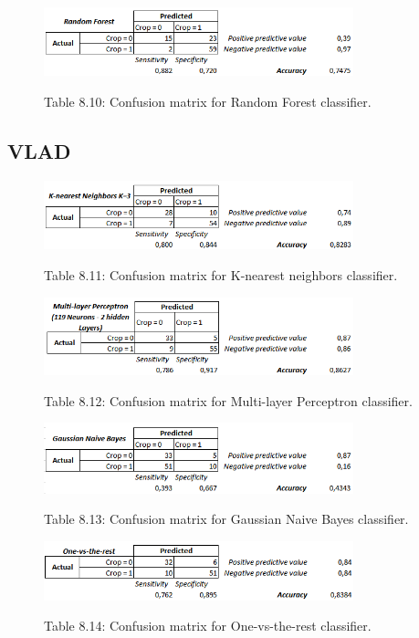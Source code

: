 \documentclass[12pt]{article}
\numberwithin{equation}{section}
\numberwithin{table}{section}
\numberwithin{figure}{section}
\begin{document}
\begin{figure}[H] \centering
	\caption*{Table 8.10: Confusion matrix for Random Forest classifier. }
	\includegraphics[width=0.8\textwidth]{m10.png}
	\label{m10}
\end{figure}


\subsection{VLAD}

\begin{figure}[H] \centering
	\caption*{Table 8.11: Confusion matrix for K-nearest neighbors classifier. }
	\includegraphics[width=0.8\textwidth]{m11.png}
	\label{m11}
\end{figure}

\begin{figure}[H] \centering
	\caption*{Table 8.12: Confusion matrix for Multi-layer Perceptron classifier. }
	\includegraphics[width=0.8\textwidth]{m12.png}
	\label{m12}
\end{figure}

\begin{figure}[H] \centering
	\caption*{Table 8.13: Confusion matrix for Gaussian Naive Bayes classifier. }
	\includegraphics[width=0.8\textwidth]{m13.png}
	\label{m13}
\end{figure}

\begin{figure}[H] \centering
	\caption*{Table 8.14: Confusion matrix for One-vs-the-rest classifier. }
	\includegraphics[width=0.8\textwidth]{m14.png}
	\label{m14}
\end{figure}
\end{document}
